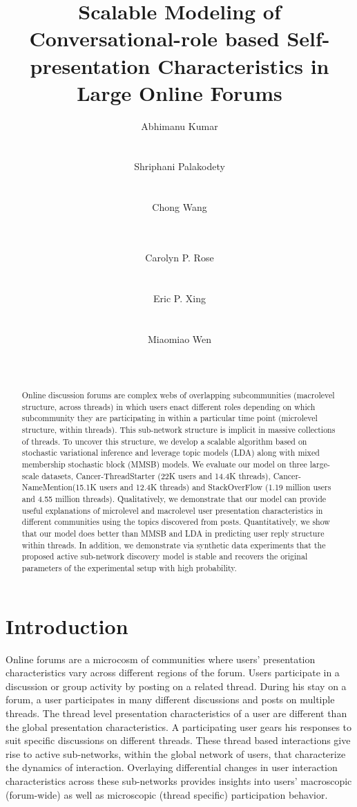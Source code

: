 \documentclass{sig-alternate}
\title{Scalable Modeling of Conversational-role based Self-presentation
Characteristics in Large Online Forums}
\author{
\alignauthor
Abhimanu Kumar \\
\affaddr{School of Computer Science}\\
\affaddr{Carnegie Mellon University}\\
\email{abhimank@cs.cmu.edu}
\alignauthor
Shriphani Palakodety \\
\affaddr{School of Computer Science}\\
\affaddr{Carnegie Mellon University}\\
\email{shriphanip@gmail.com}
\alignauthor
Chong Wang \\
\affaddr{School of Computer Science}\\
\affaddr{Carnegie Mellon University}\\
\email{chongw@cs.cmu.edu}
\alignauthor
\and
Carolyn P. Rose\\
\affaddr{School of Computer Science}\\
\affaddr{Carnegie Mellon University}\\
\email{cprose@cs.cmu.edu}
\alignauthor
Eric P. Xing\\
\affaddr{School of Computer Science}\\
\affaddr{Carnegie Mellon University}\\
\email{epxing@cs.cmu.edu}
\alignauthor
Miaomiao Wen\\
\affaddr{School of Computer Science}\\
\affaddr{Carnegie Mellon University}\\
\email{mwen@cs.cmu.edu}
}
\begin{document}
\maketitle
\begin{abstract}

Online discussion forums are complex webs of overlapping subcommunities 
(macrolevel structure, across threads) in which users enact different roles 
depending on which subcommunity they are participating in within a particular 
time point (microlevel structure, within threads).  This sub-network structure 
is implicit in massive collections of threads. To uncover this  structure, 
we develop a scalable algorithm based on stochastic variational inference and 
leverage topic models (LDA) along with mixed membership stochastic block (MMSB) 
models. We evaluate our model on three large-scale datasets, Cancer-ThreadStarter (22K
users and 14.4K threads), Cancer-NameMention(15.1K users and 12.4K threads) and
StackOverFlow (1.19 million users and 4.55 million threads). Qualitatively, we
demonstrate that our model can provide useful explanations of microlevel
and macrolevel user presentation characteristics in different communities
using the topics discovered from posts. Quantitatively, we show that our model
does better than MMSB and LDA in predicting user reply structure within threads. 
In addition, we demonstrate via synthetic 
data experiments that the proposed active sub-network discovery
model is stable and recovers the original parameters of the experimental
setup with high probability.

\end{abstract}



\section{Introduction}
Online forums are a microcosm of communities where users' presentation
characteristics vary across different regions of the forum. Users participate in
a discussion or group activity by posting on a related thread. During his
stay on a forum, a user participates in many different discussions and posts on
multiple threads. The thread level presentation characteristics of a user are different
than the global presentation characteristics. A participating user gears his
responses to suit specific discussions on different threads. These thread based
interactions give rise to active sub-networks, within the global network of users,
that characterize the dynamics of interaction. Overlaying differential changes
in user interaction characteristics across these sub-networks provides
insights into users' macroscopic (forum-wide) as well as microscopic (thread
specific) participation behavior. 
\end{document}
